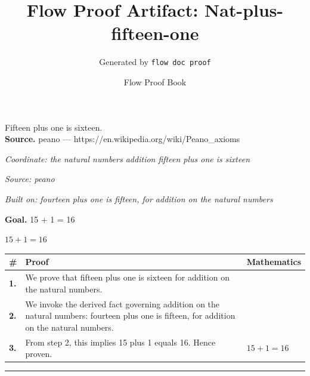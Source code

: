 \documentclass[11pt]{article}
\title{Flow Proof Artifact: Nat-plus-fifteen-one}
\author{Generated by \texttt{flow doc proof}}
\date{Flow Proof Book}
\theoremstyle{definition}
\begin{document}
\maketitle
Fifteen plus one is sixteen.\\[0.5em]
\textbf{Source.} peano — https://en.wikipedia.org/wiki/Peano\_axioms\\[0.5em]
\bigskip
{}\par
\smallskip\noindent\textit{Coordinate: the natural numbers \cdot addition \cdot fifteen plus one is sixteen}\par
\smallskip\noindent\textit{Source: peano}\par
\smallskip\noindent\textit{Built on: fourteen plus one is fifteen, for addition on the natural numbers}\par
\medskip
\noindent\textbf{Goal.} 15 + 1 = 16\par
\noindent$\displaystyle 15 + 1 = 16$\par
\medskip
\noindent
\begin{tabular}{@{} >{\raggedright\arraybackslash}p{} >{\raggedright\arraybackslash}p{} >{\raggedleft\arraybackslash}p{} @{}}
\textbf{\#} & \textbf{Proof} & \textbf{Mathematics} \\
\midrule
\textbf{1.} & We prove that fifteen plus one is sixteen for addition on the natural numbers. & \\[0.45em]
\textbf{2.} & We invoke the derived fact governing addition on the natural numbers: fourteen plus one is fifteen, for addition on the natural numbers. & \\[0.45em]
\textbf{3.} & From step 2, this implies 15 plus 1 equals 16. Hence proven. & $\displaystyle 15 + 1 = 16$ \\[0.45em]
\bottomrule
\end{tabular}
\label{thm:Nat-addition-fifteen_plus_one_is_sixteen}
\par\medskip\hrule
\end{document}
